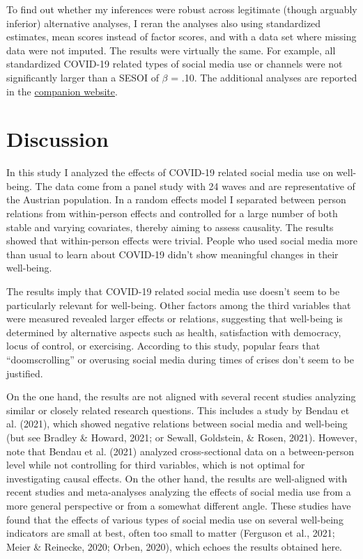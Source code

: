 \documentclass[
  english,
  man,floatsintext]{apa6}
\begin{document}
To find out whether my inferences were robust across legitimate (though arguably inferior) alternative analyses, I reran the analyses also using standardized estimates, mean scores instead of factor scores, and with a data set where missing data were not imputed.
The results were virtually the same.
For example, all standardized COVID-19 related types of social media use or channels were not significantly larger than a SESOI of \(\beta\) = \textbar.10\textbar.
The additional analyses are reported in the \href{https://tdienlin.github.io/Austrian_Corona_Panel/analyses_additional.html}{companion website}.

\hypertarget{discussion}{%
\section{Discussion}\label{discussion}}

In this study I analyzed the effects of COVID-19 related social media use on well-being.
The data come from a panel study with 24 waves and are representative of the Austrian population.
In a random effects model I separated between person relations from within-person effects and controlled for a large number of both stable and varying covariates, thereby aiming to assess causality.
The results showed that within-person effects were trivial.
People who used social media more than usual to learn about COVID-19 didn't show meaningful changes in their well-being.

The results imply that COVID-19 related social media use doesn't seem to be particularly relevant for well-being.
Other factors among the third variables that were measured revealed larger effects or relations, suggesting that well-being is determined by alternative aspects such as health, satisfaction with democracy, locus of control, or exercising.
According to this study, popular fears that ``doomscrolling'' or overusing social media during times of crises don't seem to be justified.

On the one hand, the results are not aligned with several recent studies analyzing similar or closely related research questions.
This includes a study by Bendau et al. (2021), which showed negative relations between social media and well-being (but see Bradley \& Howard, 2021; or Sewall, Goldstein, \& Rosen, 2021).
However, note that Bendau et al. (2021) analyzed cross-sectional data on a between-person level while not controlling for third variables, which is not optimal for investigating causal effects.
On the other hand, the results are well-aligned with recent studies and meta-analyses analyzing the effects of social media use from a more general perspective or from a somewhat different angle.
These studies have found that the effects of various types of social media use on several well-being indicators are small at best, often too small to matter (Ferguson et al., 2021; Meier \& Reinecke, 2020; Orben, 2020), which echoes the results obtained here.
\end{document}
